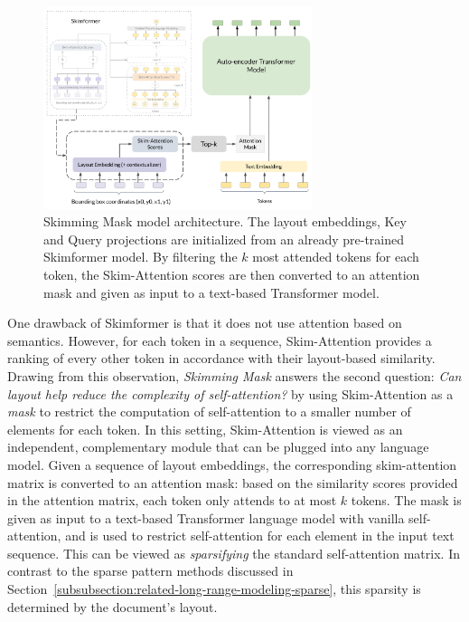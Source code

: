 \begin{figure}
    \centering
    \includegraphics[width=0.7\textwidth]{images/chapter3/skimmingmask-architecture.pdf}
    \caption{Skimming Mask model architecture. The layout embeddings, Key and Query projections are initialized from an already pre-trained Skimformer model. By filtering the $k$ most attended tokens for each token, the Skim-Attention scores are then converted to an attention mask and given as input to a text-based Transformer model.}
    \label{fig:skimmingmask-architecture}
\end{figure}

One drawback of Skimformer is that it does not use attention based on semantics. However, for each token in a sequence, Skim-Attention provides a ranking of every other token in accordance with their layout-based similarity. Drawing from this observation, \emph{Skimming Mask} answers the second question: \textit{Can layout help reduce the complexity of self-attention?} by using Skim-Attention as a \textit{mask} to restrict the computation of self-attention to a smaller number of elements for each token. In this setting, Skim-Attention is viewed as an independent, complementary module that can be plugged into any language model. Given a sequence of layout embeddings, the corresponding skim-attention matrix is converted to an attention mask: based on the similarity scores provided in the attention matrix, each token only attends to at most $k$ tokens. The mask is given as input to a text-based Transformer language model with vanilla self-attention, and is used to restrict self-attention for each element in the input text sequence. This can be viewed as \emph{sparsifying} the standard self-attention matrix. In contrast to the sparse pattern methods discussed in Section~\ref{subsubsection:related-long-range-modeling-sparse}, this sparsity is determined by the document's layout.

